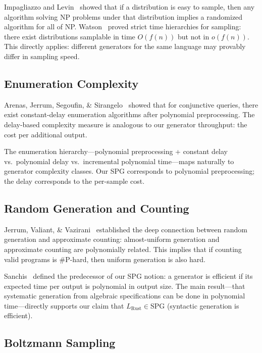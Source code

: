 \documentclass[11pt]{article}
\newcommand{\SPG}{\text{SPG}}
\theoremstyle{remark}
\theoremstyle{definition}
\begin{document}
Impagliazzo and Levin~\cite{impagliazzo1990better} showed that if a distribution
is easy to sample, then any algorithm solving NP problems under that
distribution implies a randomized algorithm for all of NP.  Watson~\cite{watson2017time}
proved strict time hierarchies for sampling: there exist distributions
samplable in time $O(f(n))$ but not in $o(f(n))$.  This directly applies: different
generators for the same language may provably differ in sampling speed.

\subsection{Enumeration Complexity}

Arenas, Jerrum, Segoufin, \& Sirangelo~\cite{arenas2019constant} showed that for
conjunctive queries, there exist constant-delay enumeration algorithms after
polynomial preprocessing.  The delay-based complexity measure is analogous to our
generator throughput: the cost per additional output.

The enumeration hierarchy---polynomial preprocessing + constant delay vs.\
polynomial delay vs.\ incremental polynomial time---maps naturally to generator
complexity classes.  Our SPG corresponds to polynomial preprocessing; the delay
corresponds to the per-sample cost.

\subsection{Random Generation and Counting}

Jerrum, Valiant, \& Vazirani~\cite{jerrum1986random} established the deep
connection between random generation and approximate counting: almost-uniform
generation and approximate counting are polynomially related.  This implies that
if counting valid programs is \#P-hard, then uniform generation is also hard.

Sanchis~\cite{sanchis1990data} defined the predecessor of our SPG notion: a
generator is efficient if its expected time per output is polynomial in output
size.  The main result---that systematic generation from algebraic
specifications can be done in polynomial time---directly supports our claim
that $L_{\text{Rust}} \in \SPG{}$ (syntactic generation is efficient).

\subsection{Boltzmann Sampling}
\end{document}
